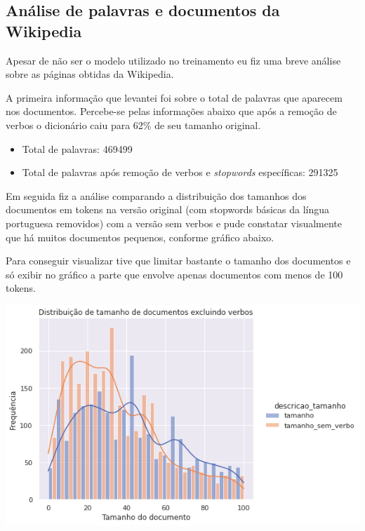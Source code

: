 \subsection{Análise de palavras e documentos da Wikipedia}

Apesar de não ser o modelo utilizado no treinamento eu fiz uma breve análise sobre as páginas obtidas da Wikipedia.

A primeira informação que levantei foi sobre o total de palavras que aparecem nos documentos. Percebe-se pelas informações abaixo que após a remoção de verbos 
 o dicionário caiu para 62\% de seu tamanho original.

\begin{itemize}
    \item Total de palavras: 469499
    \item Total de palavras após remoção de verbos e \textit{stopwords} específicas: 291325
\end{itemize}

Em seguida fiz a análise comparando a distribuição dos tamanhos dos documentos em tokens na versão original (com stopwords básicas da língua portuguesa 
removidos) com a versão sem verbos e pude constatar visualmente que há muitos documentos pequenos, conforme gráfico abaixo.

Para conseguir visualizar tive que limitar bastante o tamanho dos documentos e só exibir no gráfico a parte que envolve apenas documentos com menos de 
100 tokens.

\vspace{3mm} %

\includegraphics[scale=0.75]{explore/resources/wp_comparacao_distribuicao_tamanhos_kde_max100.png}

\vspace{3mm} %

